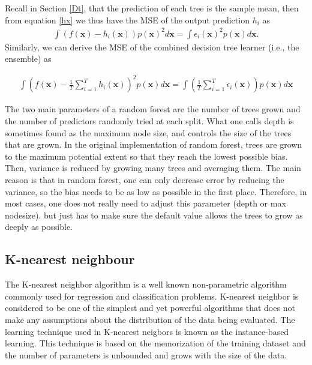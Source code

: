 Recall in Section \ref{Dt}, that the prediction of  each tree is the sample mean, then from equation \ref{hx} we thus have the MSE of the output prediction $h_i$ as 
\begin{align}
\int (f(\textbf{x})-h_{i}(\textbf{x}))p(\textbf{x})^2d\textbf{x} = \int \epsilon_{i} (\textbf{x})^2 p(\textbf{x})d\textbf{x}.
\end{align}
Similarly, we can derive the MSE of the combined decision tree learner (i.e., the ensemble) as 

\begin{align}
\int \left(f(\textbf{x}) - \frac{1}{T}\sum_{i=1}^{T} h_{i}(\textbf{x}) \right)^2  p(\textbf{x})d\textbf{x} = \int \left( \frac{1}{T}\sum_{i=1}^{T} \epsilon_{i}(\textbf{x})\right)p(\textbf{x})d\textbf{x}
\end{align} 


The two main parameters of a random forest are the number of trees grown and the number of predictors randomly tried at each split. What one calls depth is sometimes found as the maximum node size, and controls the size of the trees that are grown. In the original implementation of random forest, trees are grown to the maximum potential extent so that they reach the lowest possible bias. Then, variance is reduced by growing many trees and averaging them. The main reason is that in random forest, one can only decrease error by reducing the variance, so the bias needs to be as low as possible in the first place. Therefore, in most cases, one does not really need to adjust this parameter (depth or max nodesize). but just has to make sure the default value allows the trees to grow as deeply as possible.

\subsection{K-nearest neighbour}

The K-nearest neighbor algorithm is a well known non-parametric algorithm commonly used for regression and classification problems. K-nearest neighbor is considered to be one of the simplest and yet powerful algorithms that does not make any assumptions about the distribution of the data being evaluated. The learning technique used in K-nearest neigbors is known as the instance-based learning. This technique is based on the memorization of the training dataset and the number of parameters is unbounded and grows with the size of the data. 


